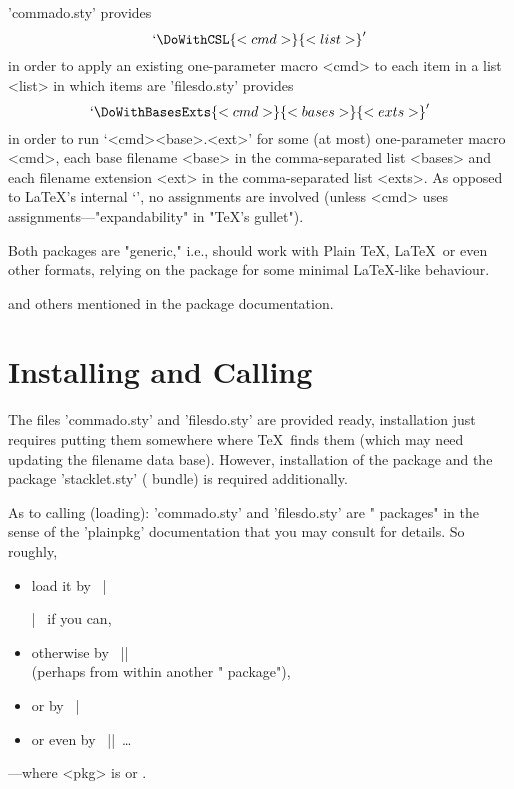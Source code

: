 \documentclass{article} %
\begin{document}
\maketitle
\begin{MDabstract}
'commado.sty' provides \[`\DoWithCSL{<cmd>}{<list>}'\] 
in order to apply an existing one-parameter macro <cmd> 
to each item in a list <list> in which items are 
'filesdo.sty' provides \[`\DoWithBasesExts{<cmd>}{<bases>}{<exts>}'\]
in order to run `<cmd>{<base>.<ext>}' for some (at most) 
one-parameter macro <cmd>, each base filename <base> in the 
comma-separated list <bases> and each filename extension <ext> 
in the comma-separated list <exts>.
As opposed to \LaTeX's internal `\@for', no assignments are involved 
(unless <cmd> uses assignments---"expandability" in "\TeX's gullet").

Both packages are "generic," i.e., should work with Plain \TeX,
\LaTeX\ or even other formats, relying on the  
package for some minimal \LaTeX-like behaviour.

  and others 
mentioned in the  package documentation.
\end{MDabstract}
\newpage
\tableofcontents
\section{Installing and Calling}
The files 'commado.sty' and 'filesdo.sty' 
are provided ready, installation just requires
putting them somewhere where \TeX\ finds them
(which may need updating the filename data
 base). 
However, installation of the package  
and the package 'stacklet.sty' ( bundle)
is required additionally.

As to calling (loading): 'commado.sty' and 'filesdo.sty' are 
" packages" in the sense of the 'plainpkg'
documentation that you may consult for details.
So roughly, 
\begin{itemize}
  \item load it by \ |\usepackage{<pkg>}| \ if you can, 
  \item otherwise by \ |\RequirePackage{<pkg>}| \\
        (perhaps from within another " package"), 
  \item or by \ | 
  \item or even by \ ||~\dots
\end{itemize}
---where <pkg> is  or .
\end{document}
